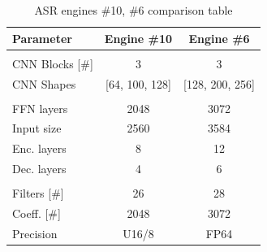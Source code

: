 \begin{table}[H]
    \centering
\begin{tabular}{ !{\color{ytblborder}\vrule}l!{\color{ytblborder}\vrule}cc| } 
    \hline

    \hline
     \color{white}\bf{Parameter} 
    & \color{white}\bf{Engine \#10} 
    & \color{white}\bf{Engine \#6} \\
    \hline

    \hline\hline
       \\
    \hline

    \hline
      CNN Blocks [\#]  
        & 3 
        & 3 \\
    \hline
    
    \hline
      CNN Shapes  
        & [64, 100, 128]
        & [128, 200, 256] \\
    \hline

    \hline\hline
       \\
    \hline

    \hline
      FFN layers  
        & 2048
        & 3072 \\
    \hline

    \hline
      Input size
        & 2560
        & 3584 \\
    \hline

    \hline
      Enc. layers
        & 8
        & 12 \\
    \hline

    \hline
      Dec. layers
        & 4
        & 6 \\
    \hline


    \hline\hline
       \\
    \hline

    \hline
      Filters [\#] 
        & 26
        & 28 \\
    \hline

    \hline
     Coeff. [\#]  
        & 2048
        & 3072 \\
    \hline

    \hline
     Precision  
        & U16/8
        & FP64 \\
    \hline

    \hline
\end{tabular}
\caption{ASR engines \#10, \#6 comparison table}
\label{tbl:engine_101_72}
\end{table}



